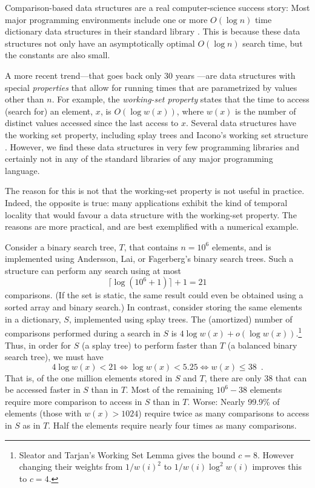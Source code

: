 \documentclass[lotsofwhite]{patmorin}
\begin{document}
Comparison-based data structures are a real
computer-science success story: Most major programming environments
include one or more $O(\log n)$ time dictionary data structures in their
standard library \cite{S}.  This is because these data structures not
only have an asymptotically optimal $O(\log n)$ search time, but the
constants are also small.




A more recent trend---that goes back only 30 years \cite{X}---are data
structures with special \emph{properties} that allow for running
times that are parametrized by values other than $n$.  For example,
the \emph{working-set property} states that the time to access (search
for) an element, $x$, is $O(\log w(x))$, where $w(x)$ is the number
of distinct values accessed since the last access to $x$. Several data
structures have the working set property, including splay trees \cite{S}
and Iacono's working set structure \cite{S}.  However, we find
these data structures in very few programming libraries and certainly
not in any of the standard libraries of any major programming language.

The reason for this is not that the working-set property is not useful
in practice.  Indeed, the opposite is true: many applications exhibit
the kind of temporal locality that would favour a data structure with
the working-set property.  The reasons are more practical, and are best
exemplified with a numerical example.

Consider a binary search tree, $T$, that contains $n=10^6$ elements, and
is implemented using Andersson, Lai, or Fagerberg's binary search trees.
Such a structure can perform any search using at most
\[
   \lceil\log(10^6+1)\rceil+1= 21
\]
comparisons. (If the set is static, the same result could even be obtained
using a sorted array and binary search.)  In contrast, consider storing
the same elements in a dictionary, $S$, implemented using splay trees.
The (amortized) number of comparisons performed during a search in $S$
is $4\log w(x)+o(\log w(x))$.\footnote{Sleator and Tarjan's Working
    Set Lemma \cite{X} gives the bound $c=8$.  However changing their
    weights from $1/w(i)^2$ to $1/w(i)\log^2 w(i)$ improves this to
    $c=4$.}  Thus, in order for $S$
(a splay tree)
to perform faster than $T$ (a balanced binary search tree), we must have
\[
   4\log w(x) < 21 
       \Leftrightarrow \log w(x) < 5.25 
       \Leftrightarrow w(x) \le 38 \enspace .
\]
That is, of the one million elements stored in $S$ and $T$, there are
only 38 that can be accessed faster in $S$ than in $T$.  Most of the
remaining $10^6 - 38$ elements require more comparison to access in $S$
than in $T$.  Worse: Nearly 99.9\% of elements (those with $w(x)>1024$)
require twice as many comparisons to access in $S$ as in $T$.  Half the
elements require nearly four times as many comparisons.
\end{document}
